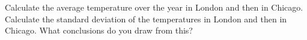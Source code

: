 \documentclass[11pt,class=report,crop=false]{standalone}
\begin{document}
\begin{activite}
\begin{enumerate}
{\small	  
}



  Calculate the average temperature over the year in London and then in Chicago. Calculate the standard deviation of the temperatures in London and then in Chicago. What conclusions do you draw from this? 

\end{enumerate}

\end{activite}



\end{document}

